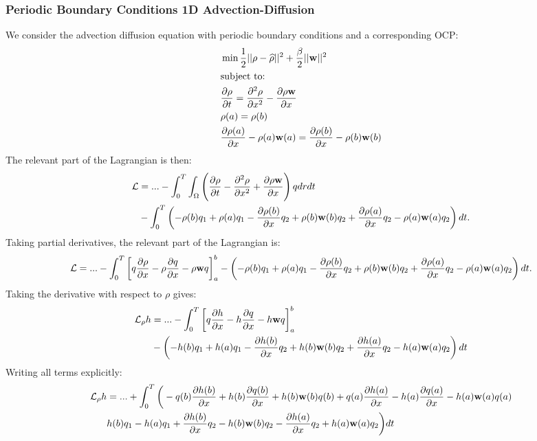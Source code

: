 \subsubsection{Periodic Boundary Conditions 1D Advection-Diffusion}
We consider the advection diffusion equation with periodic boundary conditions and a corresponding OCP:
\begin{align*}
	&\min \frac{1}{2}|| \rho - \widehat \rho||^2 + \frac{\beta}{2}||\mathbf{w}||^2\\
	&\text{subject to:}\\
	&\frac{\partial \rho}{\partial t} = \frac{\partial^2 \rho}{\partial x^2} - \frac{\partial \rho \mathbf{w}}{\partial x}\\
	& \rho(a) = \rho(b)\\
	& \frac{\partial \rho(a)}{\partial x} - \rho(a) \mathbf{w}(a) = \frac{\partial \rho(b)}{\partial x}  - \rho(b) \mathbf{w}(b)
\end{align*}
The relevant part of the Lagrangian is then:
\begin{align*}
	\mathcal{L} &= ... -\int_0^T \int_\Omega \left(\frac{\partial \rho}{\partial t} - \frac{\partial^2 \rho}{\partial x^2} + \frac{\partial \rho \mathbf{w}}{\partial x}\right)q dr dt \\
	&- \int_0^T \left(-\rho(b)q_1 + \rho(a)q_1 - \frac{\partial \rho(b)}{\partial x}q_2 + \rho(b)\mathbf{w}(b)q_2 + \frac{\partial \rho(a)}{\partial x}q_2 - \rho(a)\mathbf{w}(a)q_2\right) dt.
\end{align*}
Taking partial derivatives, the relevant part of the Lagrangian is:
\begin{align*}
	\mathcal{L} = ... - \int_0^T \left[q \frac{\partial \rho}{\partial x} - \rho\frac{\partial q}{\partial x} - \rho \mathbf{w} q\right]_a^b -
	\left(-\rho(b)q_1 + \rho(a)q_1 - \frac{\partial \rho(b)}{\partial x}q_2 + \rho(b)\mathbf{w}(b)q_2 + \frac{\partial \rho(a)}{\partial x}q_2 - \rho(a)\mathbf{w}(a)q_2\right)dt.
\end{align*}
Taking the derivative with respect to $\rho$ gives:
\begin{align*}
	\mathcal{L}_\rho h &= ... - \int_0^T \left[q \frac{\partial h}{\partial x} - h\frac{\partial q}{\partial x} - h \mathbf{w} q\right]_a^b \\
	&-
	\left(-h(b)q_1 + h(a)q_1 - \frac{\partial h(b)}{\partial x}q_2 + h(b)\mathbf{w}(b)q_2 + \frac{\partial h(a)}{\partial x}q_2 - h(a)\mathbf{w}(a)q_2\right)dt
\end{align*}
Writing all terms explicitly:
\begin{align*}
	\mathcal{L}_\rho h &= ... + \int_0^T \bigg(- q(b) \frac{\partial h(b)}{\partial x} + h(b)\frac{\partial q(b)}{\partial x} + h(b) \mathbf{w}(b) q(b) + q(a) \frac{\partial h (a)}{\partial x} - h(a)\frac{\partial q(a)}{\partial x} - h(a) \mathbf{w}(a) q(a)  \\
	&h(b)q_1 - h(a)q_1 + \frac{\partial h(b)}{\partial x}q_2 - h(b)\mathbf{w}(b)q_2 - \frac{\partial h(a)}{\partial x}q_2 + h(a)\mathbf{w}(a)q_2 \bigg)dt
\end{align*}

